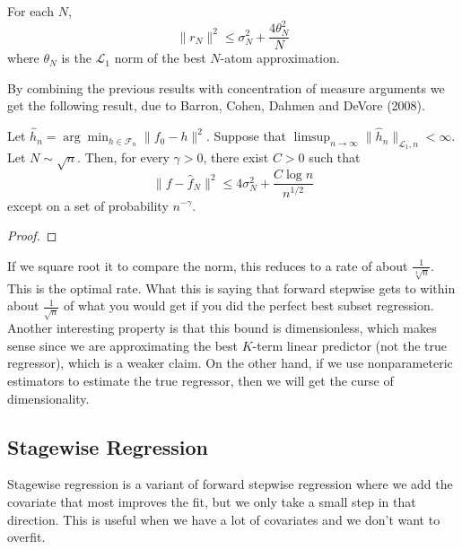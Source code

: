   \begin{corollary}
    For each $N$,
    \begin{equation}
      \|r_N\|^2 \leq \sigma_N^2 + \frac{4\theta_N^2}{N}
    \end{equation}
    where $\theta_N$ is the $\mathcal{L}_1$ norm of the best $N$-atom approximation.
  \end{corollary}

  By combining the previous results with concentration of measure arguments we get the following result, due to Barron, Cohen, Dahmen and DeVore (2008).

  \begin{theorem}
    Let $\hat{h}_n = \arg\min_{h \in \mathcal{F}_n} \|f_0 - h\|^2$. Suppose that $\limsup_{n \to \infty} \|\hat{h}_n\|_{\mathcal{L}_1,n} < \infty$. Let $N \sim \sqrt{n}$. Then, for every $\gamma > 0$, there exist $C > 0$ such that
    \begin{equation}
      \|f - \hat{f}_N\|^2 \leq 4\sigma_N^2 + \frac{C \log n}{n^{1/2}}
    \end{equation}
    except on a set of probability $n^{-\gamma}$.
  \end{theorem} 
  \begin{proof}
    
  \end{proof}

  If we square root it to compare the norm, this reduces to a rate of about $\frac{1}{\sqrt[4]{n}}$. This is the optimal rate. What this is saying that forward stepwise gets to within about $\frac{1}{\sqrt{n}}$ of what you would get if you did the perfect best subset regression. Another interesting property is that this bound is dimensionless, which makes sense since we are approximating the best $K$-term linear predictor (not the true regressor), which is a weaker claim. On the other hand, if we use nonparameteric estimators to estimate the true regressor, then we will get the curse of dimensionality. 

\subsection{Stagewise Regression} 

  Stagewise regression is a variant of forward stepwise regression where we add the covariate that most improves the fit, but we only take a small step in that direction. This is useful when we have a lot of covariates and we don't want to overfit. 

